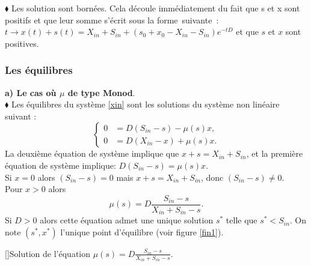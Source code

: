 \documentclass[12pt,a4paper]{report}%
\begin{document}
$\blacklozenge$ Les solution sont bornées. Cela découle immédiatement du fait que s et x sont positifs et que leur somme s'écrit sous la forme suivante :\\
 $t \rightarrow x(t)+s(t)=X_{in}+S_{in}+(s_0+x_0-X_{in}-S_{in})e^{-t D} $ et que $s$ et $x$ sont positives.
\subsubsection{Les équilibres }
{\bf a) Le cas où $\mu$ de type Monod}.\\
$\blacklozenge$ Les équilibres du système \eqref{xin} sont les solutions du système non linéaire suivant :  
\begin{equation}
	\left\{\begin{aligned}
		0 & =D \left(S_{in}-s\right) - \mu(s)x, \\
		0 & =D(X_{in}-x)+\mu(s) x  .
	\end{aligned}\right.
\end{equation}
La deuxième équation de système implique que $x+s=X_{in}+S_{in}$, et la première équation de système implique: $ D \left(S_{in}-s\right) = \mu(s)x$.\\
Si $x=0$ alors $ (S_{in}-s) =0 $ mais $x+s=X_{in}+S_{in}$, donc $ (S_{in}-s) \neq 0 $.\\
Pour $x > 0$ alors 
$$
\mu(s) =  D \frac{S_{in}-s}{X_{in}+S_{in}-s}.
$$
Si $D > 0$ alors cette équation admet une unique solution $s^*$ telle que $s^* < S_{in}$. On note $(s^*, x^*)$ l'unique point d'équilibre (voir figure \ref{fin1}).
\begin{center}
[]{Solution de l'équation $\mu(s) =  D \frac{S_{in}-s}{X_{in}+S_{in}-s}$.}
\label{fin1}
\end{center}
\end{document}
